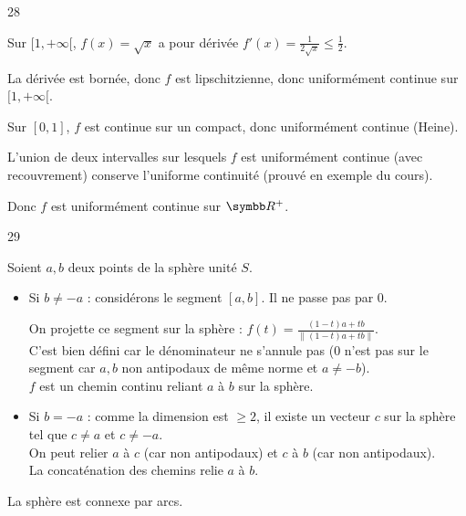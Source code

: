 \begin{correction}{28}

    Sur $[1, +\infty[$, $f(x) = \sqrt{x}$ a pour dérivée $f'(x) = \frac{1}{2\sqrt{x}} \leqslant \frac{1}{2}$.

    La dérivée est bornée, donc $f$ est lipschitzienne, donc uniformément continue sur $[1, +\infty[$.

    Sur $[0, 1]$, $f$ est continue sur un compact, donc uniformément continue (Heine).

    L'union de deux intervalles sur lesquels $f$ est uniformément continue (avec recouvrement)
    conserve l'uniforme continuité (prouvé en exemple du cours).

    Donc $f$ est uniformément continue sur $\R^{+}$.
\end{correction}

\begin{correction}{29}

    Soient $a, b$ deux points de la sphère unité $S$.

    \begin{itemize}
    \item 
        Si $b \neq -a$ :
        considérons le segment $[a,b]$. Il ne passe pas par 0.
        
        On projette ce segment sur la sphère : $f(t) = \frac{(1-t)a + tb}{\|(1-t)a + tb\|}$. \\
        C'est bien défini car le dénominateur ne s'annule pas
        ($0$ n'est pas sur le segment car $a, b$ non antipodaux de même norme et $a \neq -b$). \\
        $f$ est un chemin continu reliant $a$ à $b$ sur la sphère.
    \item
        Si $b = -a$ :
        comme la dimension est $\geqslant 2$, il existe un vecteur $c$ sur la sphère tel que $c \neq a$ et $c \neq -a$. \\
        On peut relier $a$ à $c$ (car non antipodaux) et $c$ à $b$ (car non antipodaux). \\
        La concaténation des chemins relie $a$ à $b$. \\
    \end{itemize}

    La sphère est connexe par arcs.
\end{correction}

